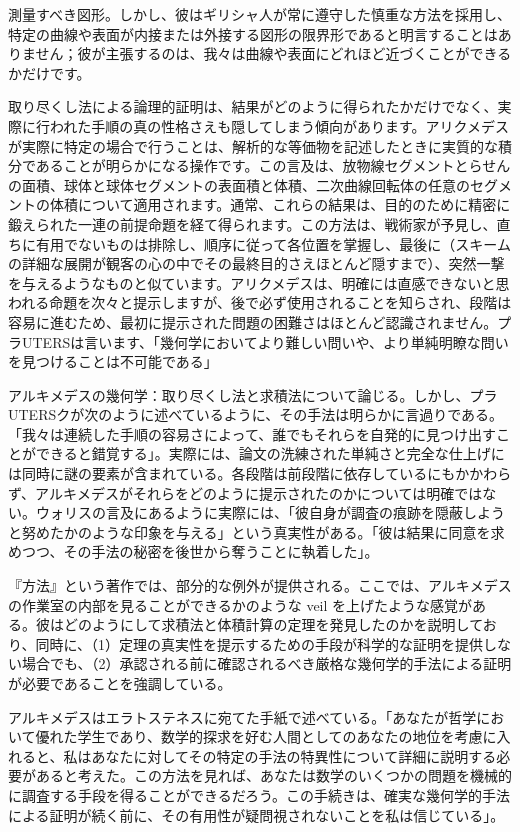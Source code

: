 \documentclass[a4paper,11pt,openany]{ltjsbook}
\begin{document}
測量すべき図形。しかし、彼はギリシャ人が常に遵守した慎重な方法を採用し、特定の曲線や表面が内接または外接する図形の限界形であると明言することはありません；彼が主張するのは、我々は曲線や表面にどれほど近づくことができるかだけです。

取り尽くし法による論理的証明は、結果がどのように得られたかだけでなく、実際に行われた手順の真の性格さえも隠してしまう傾向があります。アリクメデスが実際に特定の場合で行うことは、解析的な等価物を記述したときに実質的な積分であることが明らかになる操作です。この言及は、放物線セグメントとらせんの面積、球体と球体セグメントの表面積と体積、二次曲線回転体の任意のセグメントの体積について適用されます。通常、これらの結果は、目的のために精密に鍛えられた一連の前提命題を経て得られます。この方法は、戦術家が予見し、直ちに有用でないものは排除し、順序に従って各位置を掌握し、最後に（スキームの詳細な展開が観客の心の中でその最終目的さえほとんど隠すまで）、突然一撃を与えるようなものと似ています。アリクメデスは、明確には直感できないと思われる命題を次々と提示しますが、後で必ず使用されることを知らされ、段階は容易に進むため、最初に提示された問題の困難さはほとんど認識されません。プラUTERSは言います、「幾何学においてより難しい問いや、より単純明瞭な問いを見つけることは不可能である」

アルキメデスの幾何学：取り尽くし法と求積法について論じる。しかし、プラUTERSクが次のように述べているように、その手法は明らかに言過りである。「我々は連続した手順の容易さによって、誰でもそれらを自発的に見つけ出すことができると錯覚する」。実際には、論文の洗練された単純さと完全な仕上げには同時に謎の要素が含まれている。各段階は前段階に依存しているにもかかわらず、アルキメデスがそれらをどのように提示されたのかについては明確ではない。ウォリスの言及にあるように実際には、「彼自身が調査の痕跡を隠蔽しようと努めたかのような印象を与える」という真実性がある。「彼は結果に同意を求めつつ、その手法の秘密を後世から奪うことに執着した」。

『方法』という著作では、部分的な例外が提供される。ここでは、アルキメデスの作業室の内部を見ることができるかのような veil を上げたような感覚がある。彼はどのようにして求積法と体積計算の定理を発見したのかを説明しており、同時に、（1）定理の真実性を提示するための手段が科学的な証明を提供しない場合でも、（2）承認される前に確認されるべき厳格な幾何学的手法による証明が必要であることを強調している。

アルキメデスはエラトステネスに宛てた手紙で述べている。「あなたが哲学において優れた学生であり、数学的探求を好む人間としてのあなたの地位を考慮に入れると、私はあなたに対してその特定の手法の特異性について詳細に説明する必要があると考えた。この方法を見れば、あなたは数学のいくつかの問題を機械的に調査する手段を得ることができるだろう。この手続きは、確実な幾何学的手法による証明が続く前に、その有用性が疑問視されないことを私は信じている」。
\end{document}

